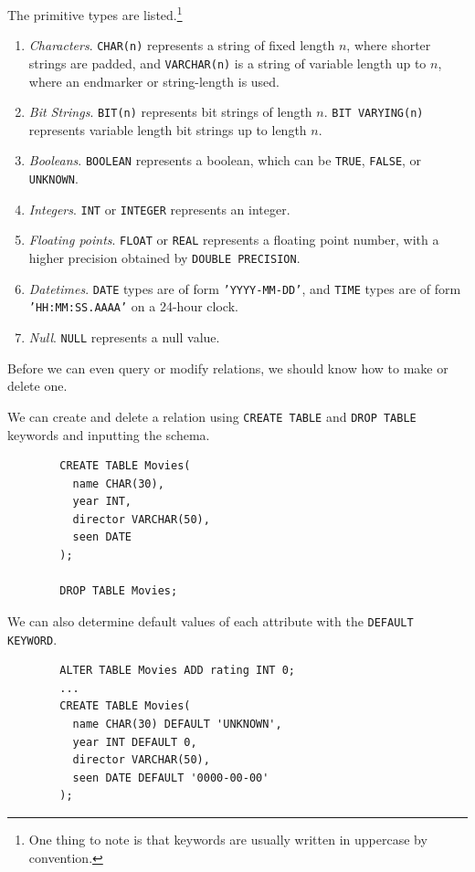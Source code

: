     \begin{definition}
      The primitive types are listed.\footnote{One thing to note is that keywords are usually written in uppercase by convention.}
      \begin{enumerate}
        \item \textit{Characters}. \texttt{CHAR(n)} represents a string of fixed length $n$, where shorter strings are padded, and \texttt{VARCHAR(n)} is a string of variable length up to $n$, where an endmarker or string-length is used. 
        \item \textit{Bit Strings}. \texttt{BIT(n)} represents bit strings of length $n$. \texttt{BIT VARYING(n)} represents variable length bit strings up to length $n$. 
        \item \textit{Booleans}. \texttt{BOOLEAN} represents a boolean, which can be \texttt{TRUE}, \texttt{FALSE}, or \texttt{UNKNOWN}. 
        \item \textit{Integers}. \texttt{INT} or \texttt{INTEGER} represents an integer. 
        \item \textit{Floating points}. \texttt{FLOAT} or \texttt{REAL} represents a floating point number, with a higher precision obtained by \texttt{DOUBLE PRECISION}. 
        \item \textit{Datetimes}. \texttt{DATE} types are of form \texttt{'YYYY-MM-DD'}, and \texttt{TIME} types are of form \texttt{'HH:MM:SS.AAAA'} on a 24-hour clock. 
        \item \textit{Null}. \texttt{NULL} represents a null value. 
      \end{enumerate}
    \end{definition}
    
    Before we can even query or modify relations, we should know how to make or delete one. 

    \begin{theorem}
      We can create and delete a relation using \texttt{CREATE TABLE} and \texttt{DROP TABLE} keywords and inputting the schema. 
      \begin{lstlisting}
        CREATE TABLE Movies(
          name CHAR(30), 
          year INT, 
          director VARCHAR(50), 
          seen DATE
        ); 

        DROP TABLE Movies; 
      \end{lstlisting}
    \end{theorem}

    \begin{theorem}
      We can also determine default values of each attribute with the \texttt{DEFAULT KEYWORD}. 
      \begin{lstlisting}
        ALTER TABLE Movies ADD rating INT 0; 
        ...
        CREATE TABLE Movies(
          name CHAR(30) DEFAULT 'UNKNOWN', 
          year INT DEFAULT 0, 
          director VARCHAR(50), 
          seen DATE DEFAULT '0000-00-00'
        ); 
      \end{lstlisting}
    \end{theorem}

